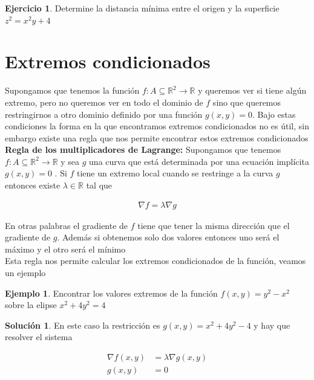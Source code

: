 \documentclass{article}
\theoremstyle{plain}
\theoremstyle{definition}
\newtheorem{ejem}[thm]{Ejemplo}
\newtheorem{ejer}[thm]{Ejercicio}
\newtheorem{sol}[thm]{Solución}
\begin{document}
\begin{ejer}Determine la distancia m\'inima entre el origen y la superficie $z^2=x^2y+4$\\
\end{ejer}


\newpage



\section{ Extremos condicionados}

Supongamos que tenemos la función  $f: A \subseteq \mathbb{R}^2 \to \mathbb{R}$ y queremos ver si tiene algún extremo, pero no queremos ver en todo el dominio de $f$ sino que queremos restringirnos a otro dominio definido por una función $g(x,y) =0$. Bajo estas condiciones la forma en la que encontramos extremos condicionados no es útil, sin embargo existe una regla que nos permite encontrar estos extremos condicionados \\

\textbf{Regla de los multiplicadores de Lagrange: } Supongamos que tenemos $f: A \subseteq \mathbb{R}^2 \to \mathbb{R}$ y sea $g$ una curva que está determinada por una ecuación implícita $g(x,y)=0$ . Si $f$ tiene un extremo local cuando se restringe a la curva $g$ entonces existe $\lambda \in \mathbb{R}$ tal que

\begin{align*}
    \nabla f = \lambda \nabla g
\end{align*}

En otras palabras el gradiente de $f$ tiene que tener la misma dirección que el gradiente de $g$. Además si obtenemos solo dos valores entonces uno será el máximo y el otro será el mínimo \\

Esta regla nos permite calcular los extremos condicionados de la función, veamos un ejemplo \\

\begin{ejem}Encontrar los valores extremos de la función $f(x,y)= y^2-x^2$ sobre la elipse $x^2+4y^2=4$ \\
\end{ejem}

\begin{sol}En este caso la restricción es $g(x,y)= x^2+4y^2-4$ y hay que resolver el sistema
\end{sol}

\begin{align*}
    \nabla f(x,y) &= \lambda \nabla g(x,y) \\
    g(x,y) &= 0
\end{align*}
\end{document}
